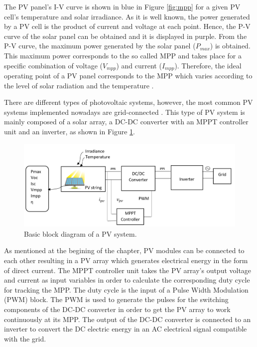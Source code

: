 The PV panel's I-V curve is shown in blue in Figure \ref{fig:mpp}
 for a given PV cell's temperature and solar irradiance. As it is well known, the power generated by a PV cell is the product of current and voltage at each point. Hence, the P-V curve of the solar panel can be obtained and it is displayed in purple. From the P-V curve, the maximum power generated by the solar panel ($P_{max}$) is obtained. This maximum power corresponds to the so called MPP and takes place for a specific combination of voltage ($V_{mpp}$) and current ($I_{mpp}$). Therefore, the ideal operating point of a PV panel corresponds to the MPP which varies according to the level of solar radiation and the temperature \cite{handbook}. 

There are different types of photovoltaic systems, however, the most common PV systems implemented nowadays are grid-connected \cite{handbook}. This type of PV system is mainly composed of a solar array, a DC-DC converter with an MPPT controller unit and an inverter, as shown in Figure \ref{fig:PVsystemblocks}. 

\begin{figure}[htbp]
	\includegraphics[width=\linewidth]{../Pictures/PV_system_blocks}
	\caption{Basic block diagram of a PV system.}
	\label{fig:PVsystemblocks}
\end{figure}

As mentioned at the begining of the chapter, PV modules can be connected to each other resulting in a PV array which generates electrical energy in the form of direct current. The MPPT controller unit takes the PV array's output voltage and current as input variables in order to calculate the corresponding duty cycle for tracking the MPP. The duty cycle is the input of a Pulse Width Modulation (PWM) block. The PWM is used to generate the pulses for the switching components of the DC-DC converter in order to get the PV array to work continuously at its MPP. The output of the DC-DC converter is connected to an inverter to convert the DC electric energy in an AC electrical signal compatible with the grid. 

